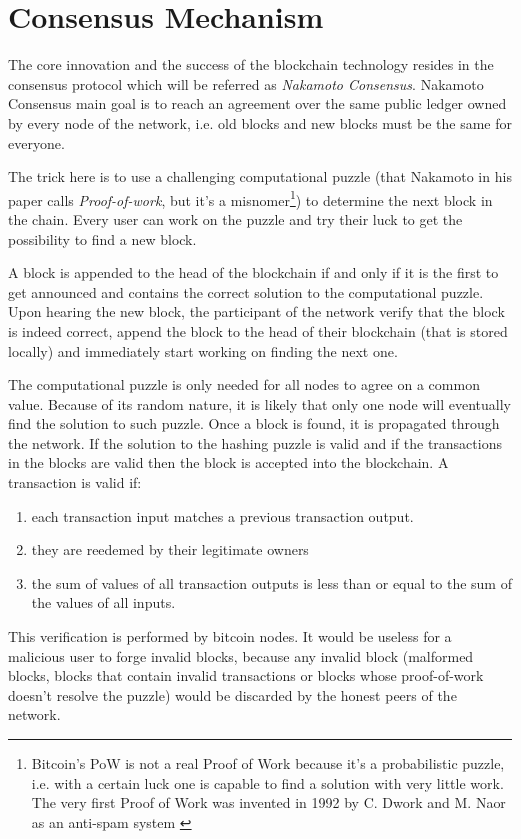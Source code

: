 	\section{Consensus Mechanism}
		The core innovation and the success of the blockchain technology resides in the consensus protocol which will be referred as \textit{Nakamoto Consensus}. Nakamoto Consensus main goal is to reach an agreement over the same public ledger owned by every node of the network, i.e. old blocks and new blocks must be the same for everyone.
		
		The trick here is to use a challenging computational puzzle (that Nakamoto in his paper calls \textit{Proof-of-work}, but it's a misnomer\footnote{Bitcoin's PoW is not a real Proof of Work because it's a probabilistic puzzle, i.e. with a certain luck one is capable to find a solution with very little work. The very first Proof of Work was invented in 1992 by C. Dwork and M. Naor as an anti-spam system \cite{Dwork1992}}) to determine the next block in the chain. Every user can work on the puzzle and try their luck to get the possibility to find a new block.
		
		A block is appended to the head of the blockchain if and only if it is the first to get announced and contains the correct solution to the computational puzzle. Upon hearing the new block, the participant of the network verify that the block is indeed correct, append the block to the head of their blockchain (that is stored locally) and immediately start working on finding the next one.
		
		The computational puzzle is only needed for all nodes to agree on a common value. Because of its random nature, it is likely that only one node will eventually find the solution to such puzzle. Once a block is found, it is propagated through the network. If the solution to the hashing puzzle is valid and if the transactions in the blocks are valid then the block is accepted into the blockchain. A transaction is valid if:
		\begin{enumerate}
			\item each transaction input matches a previous transaction output.
			\item they are reedemed by their legitimate owners
			\item the sum of values of all transaction outputs is less than or equal to the sum of the values of all inputs.
		\end{enumerate}		
		This verification is performed by bitcoin nodes. It would be useless for a malicious user to forge invalid blocks, because any invalid block (malformed blocks, blocks that contain invalid transactions or blocks whose proof-of-work doesn't resolve the puzzle) would be discarded by the honest peers of the network.
		

